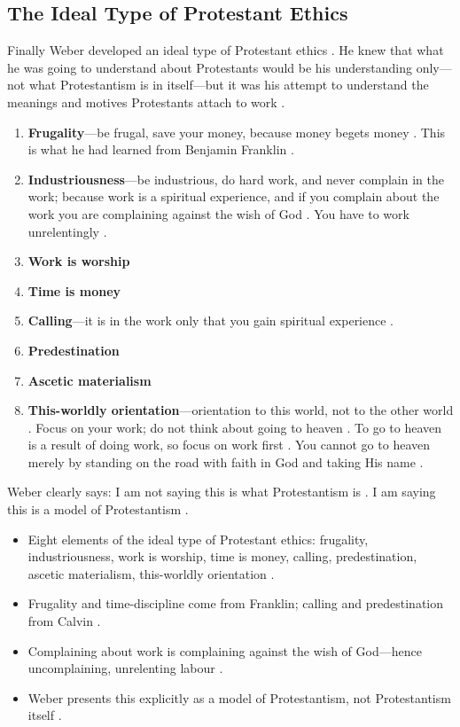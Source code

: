 \subsection{The Ideal Type of Protestant Ethics}
Finally Weber developed an ideal type of Protestant ethics . He knew that what he was going to understand about Protestants would be his understanding only---not what Protestantism is in itself---but it was his attempt to understand the meanings and motives Protestants attach to work .
\begin{enumerate}
    \item \textbf{Frugality}---be frugal, save your money, because money begets money . This is what he had learned from Benjamin Franklin .
    \item \textbf{Industriousness}---be industrious, do hard work, and never complain in the work; because work is a spiritual experience, and if you complain about the work you are complaining against the wish of God . You have to work unrelentingly .
    \item \textbf{Work is worship} 
    \item \textbf{Time is money} 
    \item \textbf{Calling}---it is in the work only that you gain spiritual experience .
    \item \textbf{Predestination} 
    \item \textbf{Ascetic materialism} 
    \item \textbf{This-worldly orientation}---orientation to this world, not to the other world . Focus on your work; do not think about going to heaven . To go to heaven is a result of doing work, so focus on work first . You cannot go to heaven merely by standing on the road with faith in God and taking His name .
\end{enumerate}

\begin{KeyConcept}
Weber clearly says: I am not saying this is what Protestantism is . I am saying this is a model of Protestantism .
\end{KeyConcept}

\begin{QuickRevision}
\begin{itemize}
    \item Eight elements of the ideal type of Protestant ethics: frugality, industriousness, work is worship, time is money, calling, predestination, ascetic materialism, this-worldly orientation .
    \item Frugality and time-discipline come from Franklin; calling and predestination from Calvin .
    \item Complaining about work is complaining against the wish of God---hence uncomplaining, unrelenting labour .
    \item Weber presents this explicitly as a model of Protestantism, not Protestantism itself .
\end{itemize}
\end{QuickRevision}

